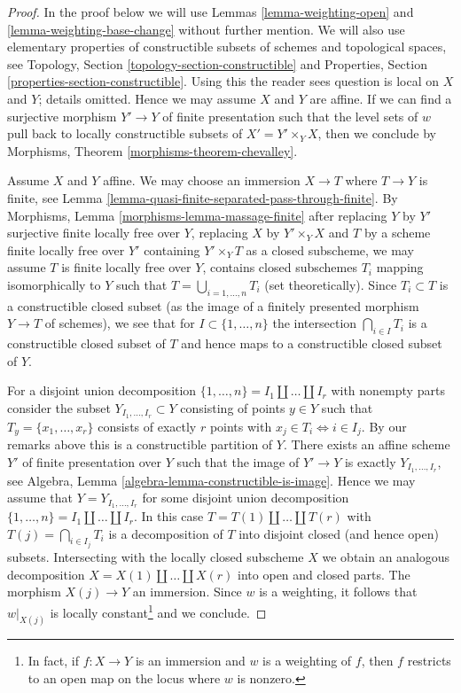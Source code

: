 \documentclass[10pt,a4paper]{amsart}
\theoremstyle{plain}
\theoremstyle{definition}
\theoremstyle{remark}
\numberwithin{equation}{subsection}
\begin{document}
\begin{proof}
In the proof below we will use Lemmas \ref{lemma-weighting-open} and
\ref{lemma-weighting-base-change} without further mention.
We will also use elementary properties of constructible subsets
of schemes and topological spaces, see
Topology, Section \ref{topology-section-constructible} and
Properties, Section \ref{properties-section-constructible}.
Using this the reader sees question is local on $X$ and $Y$;
details omitted. Hence we may assume $X$ and $Y$ are affine.
If we can find a surjective morphism $Y' \to Y$
of finite presentation such that the level sets of $w$
pull back to locally constructible subsets of $X' = Y' \times_Y X$,
then we conclude by Morphisms, Theorem \ref{morphisms-theorem-chevalley}.

\medskip\noindent
Assume $X$ and $Y$ affine. We may choose an immersion $X \to T$
where $T \to Y$ is finite, see
Lemma \ref{lemma-quasi-finite-separated-pass-through-finite}.
By Morphisms, Lemma \ref{morphisms-lemma-massage-finite}
after replacing $Y$ by $Y'$ surjective finite locally free over $Y$,
replacing $X$ by $Y' \times_Y X$ and $T$ by a scheme finite locally
free over $Y'$ containing $Y' \times_Y T$ as a closed subscheme,
we may assume $T$ is finite locally free over $Y$,
contains closed subschemes $T_i$ mapping isomorphically to $Y$
such that $T = \bigcup_{i = 1, \ldots, n} T_i$ (set theoretically).
Since $T_i \subset T$ is a constructible closed subset (as the image
of a finitely presented morphism $Y \to T$ of schemes), we see
that for $I \subset \{1, \ldots, n\}$ the intersection
$\bigcap_{i \in I} T_i$ is a constructible closed subset of $T$
and hence maps to a constructible closed subset of $Y$.

\medskip\noindent
For a disjoint union decomposition
$\{1, \ldots, n\} = I_1 \amalg \ldots \amalg I_r$ with nonempty parts
consider the subset $Y_{I_1, \ldots, I_r} \subset Y$
consisting of points $y \in Y$ such that $T_y = \{x_1, \ldots, x_r\}$
consists of exactly $r$ points with $x_j \in T_i \Leftrightarrow i \in I_j$.
By our remarks above this is a constructible partition of $Y$.
There exists an affine scheme $Y'$ of finite presentation
over $Y$ such that the image of $Y' \to Y$ is exactly
$Y_{I_1, \ldots, I_r}$, see Algebra, Lemma
\ref{algebra-lemma-constructible-is-image}.
Hence we may assume that $Y = Y_{I_1, \ldots, I_r}$ for some
disjoint union decomposition
$\{1, \ldots, n\} = I_1 \amalg \ldots \amalg I_r$.
In this case $T = T(1) \amalg \ldots \amalg T(r)$ with
$T(j) = \bigcap_{i \in I_j} T_i$
is a decomposition of $T$ into disjoint closed (and hence open) subsets.
Intersecting with the locally closed subscheme $X$ we obtain an analogous
decomposition $X = X(1) \amalg \ldots \amalg X(r)$ into open and closed parts.
The morphism $X(j) \to Y$ an immersion.
Since $w$ is a weighting, it follows that $w|_{X(j)}$
is locally constant\footnote{In fact, if $f : X \to Y$ is an
immersion and $w$ is a weighting of $f$, then $f$ restricts to an
open map on the locus where $w$ is nonzero.} and we conclude.
\end{proof}
\end{document}
